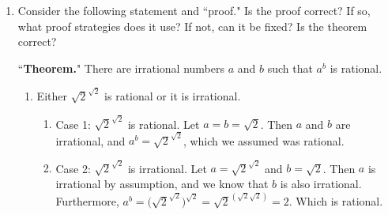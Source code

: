 \documentclass{article}
\begin{document}
\begin{enumerate}
\item Consider the following statement and ``proof." Is the proof correct? If so, what proof strategies does it use? If not, can it be fixed? Is the theorem correct?

 ``{\bf Theorem.}" There are irrational numbers $a$ and $b$ such that $a^b$ is rational.
\smallskip
\begin{enumerate}
\item[]  Either $\sqrt{2}^{\sqrt{2}}$ is rational or it is irrational.
\smallskip
\begin{enumerate}
\item[]  Case 1: $\sqrt{2}^{\sqrt{2}}$ is rational. Let $a=b=\sqrt{2}$. Then $a$ and $b$ are irrational, and $a^b=\sqrt{2}^{\sqrt{2}}$, which we assumed was rational.
\smallskip
\item[]  Case 2: $\sqrt{2}^{\sqrt{2}}$ is irrational. Let $a=\sqrt{2}^{\sqrt{2}}$ and $b=\sqrt{2}$. Then $a$ is irrational by assumption, and we know that $b$ is also irrational. Furthermore, $a^b=\bigl(\sqrt{2}^{\sqrt{2}}\bigr)^{\sqrt{2}}=\sqrt{2}^{(\sqrt{2}\sqrt{2})}=2$. Which is rational.
\end{enumerate}
\end{enumerate}


\end{enumerate}
\end{document}
